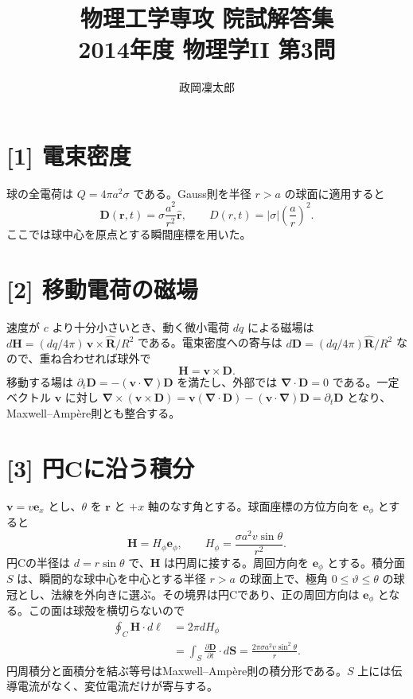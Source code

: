 \documentclass[11pt,a4paper]{article}
\title{物理工学専攻 院試解答集\\2014年度 物理学II 第3問}
\author{政岡凜太郎}
\date{}
\begin{document}
\maketitle

\section*{[1] 電束密度}
球の全電荷は $Q=4\pi a^2\sigma$ である。Gauss則を半径 $r>a$ の球面に適用すると
\begin{equation}
 \boxed{\boldsymbol D(\boldsymbol r,t)=\sigma\frac{a^2}{r^2}\hat{\boldsymbol r},\qquad
 D(r,t)=|\sigma|\left(\frac{a}{r}\right)^2.}
\end{equation}
ここでは球中心を原点とする瞬間座標を用いた。

\section*{[2] 移動電荷の磁場}
速度が $c$ より十分小さいとき、動く微小電荷 $dq$ による磁場は
$d\boldsymbol H=(dq/4\pi)\,\boldsymbol v\times\hat{\boldsymbol R}/R^2$ である。電束密度への寄与は
$d\boldsymbol D=(dq/4\pi)\hat{\boldsymbol R}/R^2$ なので、重ね合わせれば球外で
\begin{equation}
 \boxed{\boldsymbol H=\boldsymbol v\times\boldsymbol D.}
\end{equation}
移動する場は $\partial_t\boldsymbol D=-(\boldsymbol v\cdot\boldsymbol\nabla)\boldsymbol D$ を満たし、外部では $\boldsymbol\nabla\cdot\boldsymbol D=0$ である。一定ベクトル $\boldsymbol v$ に対し
$\boldsymbol\nabla\times(\boldsymbol v\times\boldsymbol D)
=\boldsymbol v(\boldsymbol\nabla\cdot\boldsymbol D)-(\boldsymbol v\cdot\boldsymbol\nabla)\boldsymbol D
=\partial_t\boldsymbol D$ となり、Maxwell--Amp\`ere則とも整合する。

\section*{[3] 円Cに沿う積分}
$\boldsymbol v=v\boldsymbol e_x$ とし、$\theta$ を $\boldsymbol r$ と $+x$ 軸のなす角とする。球面座標の方位方向を $\boldsymbol e_\phi$ とすると
\begin{equation}
 \boldsymbol H=H_\phi\boldsymbol e_\phi,\qquad
 H_\phi=\frac{\sigma a^2v\sin\theta}{r^2}.
\end{equation}
円Cの半径は $d=r\sin\theta$ で、$\boldsymbol H$ は円周に接する。周回方向を $\boldsymbol e_\phi$ とする。積分面 $S$ は、瞬間的な球中心を中心とする半径 $r>a$ の球面上で、極角 $0\leq\vartheta\leq\theta$ の球冠とし、法線を外向きに選ぶ。その境界は円Cであり、正の周回方向は $\boldsymbol e_\phi$ となる。この面は球殻を横切らないので
\begin{align}
 \oint_C\boldsymbol H\cdot d\boldsymbol\ell
 &=2\pi dH_\phi\\
 &=\int_S\frac{\partial\boldsymbol D}{\partial t}\cdot d\boldsymbol S
 =\boxed{\frac{2\pi\sigma a^2v\sin^2\theta}{r}}.
\end{align}
円周積分と面積分を結ぶ等号はMaxwell--Amp\`ere則の積分形である。$S$ 上には伝導電流がなく、変位電流だけが寄与する。
\end{document}
